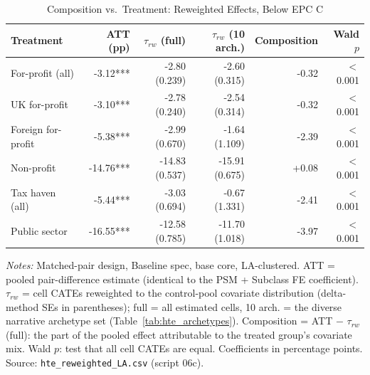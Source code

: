 \begin{table}[htbp]
\centering
\caption{Composition vs.\ Treatment: Reweighted Effects, Below EPC C}
\label{tab:hte_reweighted_bad_epc_c}
\small
\begin{tabular}{lrrrrr}
\toprule
Treatment & ATT (pp) & $\tau_{rw}$ (full) & $\tau_{rw}$ (10 arch.) & Composition & Wald $p$ \\
\midrule
For-profit (all) & -3.12*** & -2.80 (0.239) & -2.60 (0.315) & -0.32 & $<$0.001 \\
UK for-profit & -3.10*** & -2.78 (0.240) & -2.54 (0.314) & -0.32 & $<$0.001 \\
Foreign for-profit & -5.38*** & -2.99 (0.670) & -1.64 (1.109) & -2.39 & $<$0.001 \\
Non-profit & -14.76*** & -14.83 (0.537) & -15.91 (0.675) & +0.08 & $<$0.001 \\
Tax haven (all) & -5.44*** & -3.03 (0.694) & -0.67 (1.331) & -2.41 & $<$0.001 \\
Public sector & -16.55*** & -12.58 (0.785) & -11.70 (1.018) & -3.97 & $<$0.001 \\
\bottomrule
\end{tabular}
\begin{minipage}{0.95\textwidth}
\vspace{4pt}
\footnotesize
\textit{Notes:} Matched-pair design, Baseline spec, base core, LA-clustered.
ATT = pooled pair-difference estimate (identical to the PSM + Subclass FE
coefficient). $\tau_{rw}$ = cell CATEs reweighted to the control-pool covariate
distribution (delta-method SEs in parentheses); full = all estimated cells,
10 arch. = the diverse narrative archetype set (Table~\ref{tab:hte_archetypes}).
Composition = ATT $-$ $\tau_{rw}$ (full):
the part of the pooled effect attributable to the treated group's covariate mix.
Wald $p$: test that all cell CATEs are equal.
Coefficients in percentage points.
Source: \texttt{hte\_reweighted\_LA.csv} (script 06c).
\end{minipage}
\end{table}
